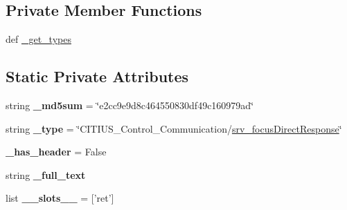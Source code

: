\subsection*{\-Private \-Member \-Functions}
\begin{DoxyCompactItemize}
\item 
def \hyperlink{class_c_i_t_i_u_s___control___communication_1_1srv_1_1__srv__focus_direct_1_1srv__focus_direct_response_a9a49b9eef4069f4a678225951d08adf9}{\-\_\-get\-\_\-types}
\end{DoxyCompactItemize}
\subsection*{\-Static \-Private \-Attributes}
\begin{DoxyCompactItemize}
\item 
\hypertarget{class_c_i_t_i_u_s___control___communication_1_1srv_1_1__srv__focus_direct_1_1srv__focus_direct_response_a1fd7db4c0b857596ab3e53a95aaaa82d}{string {\bfseries \-\_\-md5sum} = \char`\"{}e2cc9e9d8c464550830df49c160979ad\char`\"{}}\label{class_c_i_t_i_u_s___control___communication_1_1srv_1_1__srv__focus_direct_1_1srv__focus_direct_response_a1fd7db4c0b857596ab3e53a95aaaa82d}

\item 
\hypertarget{class_c_i_t_i_u_s___control___communication_1_1srv_1_1__srv__focus_direct_1_1srv__focus_direct_response_a8e90ae991a34ad0b69b5b5e13ac57ac6}{string {\bfseries \-\_\-type} = \char`\"{}\-C\-I\-T\-I\-U\-S\-\_\-\-Control\-\_\-\-Communication/\hyperlink{class_c_i_t_i_u_s___control___communication_1_1srv_1_1__srv__focus_direct_1_1srv__focus_direct_response}{srv\-\_\-focus\-Direct\-Response}\char`\"{}}\label{class_c_i_t_i_u_s___control___communication_1_1srv_1_1__srv__focus_direct_1_1srv__focus_direct_response_a8e90ae991a34ad0b69b5b5e13ac57ac6}

\item 
\hypertarget{class_c_i_t_i_u_s___control___communication_1_1srv_1_1__srv__focus_direct_1_1srv__focus_direct_response_a3819cdd15acc5c5b91e1c716b612ffd4}{{\bfseries \-\_\-has\-\_\-header} = \-False}\label{class_c_i_t_i_u_s___control___communication_1_1srv_1_1__srv__focus_direct_1_1srv__focus_direct_response_a3819cdd15acc5c5b91e1c716b612ffd4}

\item 
string {\bfseries \-\_\-full\-\_\-text}
\item 
\hypertarget{class_c_i_t_i_u_s___control___communication_1_1srv_1_1__srv__focus_direct_1_1srv__focus_direct_response_a8701b301450e5f78f80425c783d7e769}{list {\bfseries \-\_\-\-\_\-slots\-\_\-\-\_\-} = \mbox{[}'ret'\mbox{]}}\label{class_c_i_t_i_u_s___control___communication_1_1srv_1_1__srv__focus_direct_1_1srv__focus_direct_response_a8701b301450e5f78f80425c783d7e769}


\end{DoxyCompactItemize}
